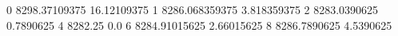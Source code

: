 0 8298.37109375 16.12109375
1 8286.068359375 3.818359375
2 8283.0390625 0.7890625
4 8282.25 0.0
6 8284.91015625 2.66015625
8 8286.7890625 4.5390625
